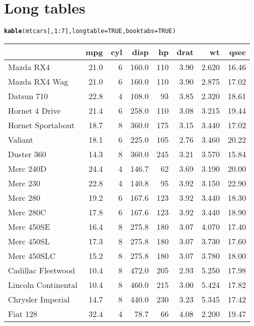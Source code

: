 \documentclass{article}\usepackage[]{graphicx}\usepackage[]{color}
\makeatletter
\newcommand{\hlfunctioncall}[1]{\textcolor[rgb]{0.501960784313725,0,0.329411764705882}{\textbf{#1}}}%
\newenvironment{kframe}{%
 \def\at@end@of@kframe{}%
 \ifinner\ifhmode%
  \def\at@end@of@kframe{\end{minipage}}%
  \begin{minipage}{\columnwidth}%
 \fi\fi%
 \def\FrameCommand##1{\hskip\@totalleftmargin \hskip-\fboxsep
 \colorbox{shadecolor}{##1}\hskip-\fboxsep
     \hskip-\linewidth \hskip-\@totalleftmargin \hskip\columnwidth}%
 \MakeFramed {\advance\hsize-\width
   \@totalleftmargin\z@ \linewidth\hsize
   \@setminipage}}%
 {\par\unskip\endMakeFramed%
 \at@end@of@kframe}
\makeatother
\begin{document}
\section{Long tables}

\begin{kframe}
\begin{alltt}
\hlfunctioncall{kable}(mtcars[, 1:7], longtable = TRUE, booktabs = TRUE)
\end{alltt}
\end{kframe}\begin{longtable}{lrrrrrrr}
\toprule
  & mpg & cyl & disp & hp & drat & wt & qsec\\
\midrule
Mazda RX4 & 21.0 & 6 & 160.0 & 110 & 3.90 & 2.620 & 16.46\\
\midrule
Mazda RX4 Wag & 21.0 & 6 & 160.0 & 110 & 3.90 & 2.875 & 17.02\\
\midrule
Datsun 710 & 22.8 & 4 & 108.0 &  93 & 3.85 & 2.320 & 18.61\\
\midrule
Hornet 4 Drive & 21.4 & 6 & 258.0 & 110 & 3.08 & 3.215 & 19.44\\
\midrule
Hornet Sportabout & 18.7 & 8 & 360.0 & 175 & 3.15 & 3.440 & 17.02\\
\midrule
Valiant & 18.1 & 6 & 225.0 & 105 & 2.76 & 3.460 & 20.22\\
\midrule
Duster 360 & 14.3 & 8 & 360.0 & 245 & 3.21 & 3.570 & 15.84\\
\midrule
Merc 240D & 24.4 & 4 & 146.7 &  62 & 3.69 & 3.190 & 20.00\\
\midrule
Merc 230 & 22.8 & 4 & 140.8 &  95 & 3.92 & 3.150 & 22.90\\
\midrule
Merc 280 & 19.2 & 6 & 167.6 & 123 & 3.92 & 3.440 & 18.30\\
\midrule
Merc 280C & 17.8 & 6 & 167.6 & 123 & 3.92 & 3.440 & 18.90\\
\midrule
Merc 450SE & 16.4 & 8 & 275.8 & 180 & 3.07 & 4.070 & 17.40\\
\midrule
Merc 450SL & 17.3 & 8 & 275.8 & 180 & 3.07 & 3.730 & 17.60\\
\midrule
Merc 450SLC & 15.2 & 8 & 275.8 & 180 & 3.07 & 3.780 & 18.00\\
\midrule
Cadillac Fleetwood & 10.4 & 8 & 472.0 & 205 & 2.93 & 5.250 & 17.98\\
\midrule
Lincoln Continental & 10.4 & 8 & 460.0 & 215 & 3.00 & 5.424 & 17.82\\
\midrule
Chrysler Imperial & 14.7 & 8 & 440.0 & 230 & 3.23 & 5.345 & 17.42\\
\midrule
Fiat 128 & 32.4 & 4 &  78.7 &  66 & 4.08 & 2.200 & 19.47\\

\end{longtable}
\end{document}

